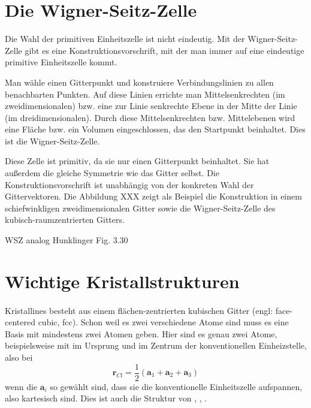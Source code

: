 \section{Die Wigner-Seitz-Zelle}

Die Wahl der primitiven Einheitszelle ist nicht eindeutig. Mit der Wigner-Seitz-Zelle gibt es eine Konstruktionsvorschrift, mit der man immer auf eine eindeutige primitive Einheitszelle kommt.

Man wähle einen Gitterpunkt und konstruiere Verbindungslinien zu allen benachbarten Punkten. Auf diese Linien errichte man Mittelsenkrechten (im zweidimensionalen) bzw. eine zur Linie senkrechte Ebene in der Mitte der Linie (im dreidimensionalen). Durch diese Mittelsenkrechten bzw. Mittelebenen wird eine Fläche bzw. ein Volumen eingeschlossen, das den Startpunkt beinhaltet. Dies ist die Wigner-Seitz-Zelle.

Diese Zelle ist primitiv, da sie nur einen Gitterpunkt beinhaltet. Sie hat außerdem die gleiche Symmetrie wie das Gitter selbst. Die Konstruktionsvorschrift ist unabhängig von der konkreten Wahl der Gittervektoren. Die Abbildung XXX zeigt als Beispiel die Konstruktion in einem schiefwinkligen zweidimensionalen Gitter sowie die Wigner-Seitz-Zelle des kubisch-raumzentrierten Gitters.

\begin{marginfigure}

\caption{WSZ analog Hunklinger Fig. 3.30}
\end{marginfigure}




\section{Wichtige Kristallstrukturen}


\paragraph{}
Kristallines  besteht aus einem flächen-zentrierten kubischen Gitter (engl: face-centered cubic, fcc). Schon weil es zwei verschiedene Atome sind muss es eine Basis mit mindestens zwei Atomen geben. Hier sind es genau zwei Atome,  beispielsweise mit  im Ursprung und  im Zentrum der konventionellen Einheizstelle, also bei
\begin{equation}
 \mathbf{r}_{Cl} = \frac{1}{2} \left(\mathbf{a}_1 + \mathbf{a}_2 +  \mathbf{a}_3  \right)
\end{equation}
wenn die $\mathbf{a}_i$ so gewählt sind, dass sie die konventionelle Einheitszelle aufspannen, also kartesisch sind. Dies ist auch die Struktur von , , .



